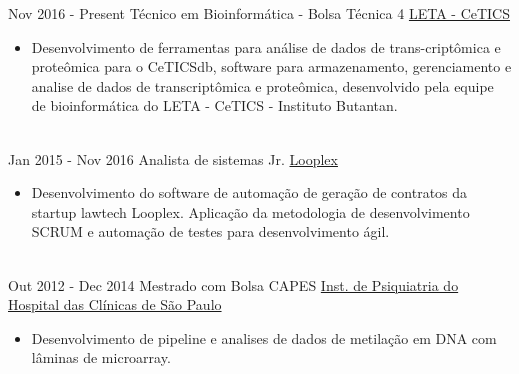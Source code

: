 \documentclass[letterpaper]{twentysecondcv} %
\begin{document}
\begin{twenty} %
\twentyitem
    	{Nov 2016 - }
		{Present}
        {Técnico em Bioinformática - Bolsa Técnica 4}
        {\href{http://cetics.butantan.gov.br/}{LETA - CeTICS}}
        {}
        {\begin{itemize}
        \item Desenvolvimento de ferramentas para análise de dados de trans-criptômica e proteômica para o CeTICSdb, software para armazenamento, gerenciamento e analise de dados de transcriptômica e proteômica, desenvolvido pela equipe de bioinformática do LETA - CeTICS - Instituto Butantan.
        \end{itemize}}
        \\
	\twentyitem
    	{Jan 2015 - }
		{Nov 2016}
        {Analista de sistemas Jr.}
        {\href{www.looplex.com.br/}{Looplex}}
        {}
        {
        {\begin{itemize}
        \item Desenvolvimento do software de automação de geração de contratos da startup lawtech Looplex. Aplicação da metodologia de desenvolvimento SCRUM e automação de testes para desenvolvimento ágil.
    \end{itemize}}
        }
    \\   
    \twentyitem
   		{Out 2012 - }
		{Dec 2014}
        {Mestrado com Bolsa CAPES }
        {\href{www.ipqhc.org.br}{ Inst. de Psiquiatria do Hospital das Clínicas de São Paulo}}
        {}
        {
        {\begin{itemize}
        \item Desenvolvimento de pipeline e analises de dados de metilação em DNA com lâminas de microarray.
    \end{itemize}}
        }       
\end{twenty}
\end{document}
